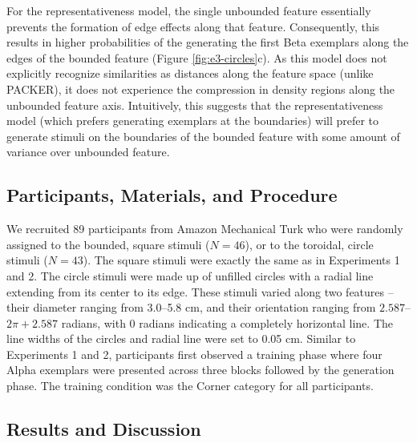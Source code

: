 \documentclass[12pt]{article}
\begin{document}
\begin{flushleft}
For the representativeness model, the single unbounded feature essentially
prevents the formation of edge effects along that feature. Consequently, this results in higher probabilities of the generating the first Beta exemplars along the edges of the bounded feature (Figure \ref{fig:e3-circles}c). As this
model does not explicitly recognize similarities as distances along the feature
space (unlike PACKER), it does not experience the compression in density regions
along the unbounded feature axis. Intuitively, this suggests that the
representativeness model (which prefers generating exemplars at the boundaries) will prefer to generate stimuli on the boundaries of the bounded feature with some amount of variance over unbounded feature.





\subsection{Participants, Materials, and Procedure}

We recruited 89 participants from Amazon Mechanical Turk who were randomly
assigned to the bounded, square stimuli ($N=46$), or to the toroidal, circle
stimuli ($N=43$). The square stimuli were exactly the same as in Experiments 1
and 2. The circle stimuli were made up of unfilled circles with a radial line
extending from its center to its edge. These stimuli varied along two features
-- their diameter ranging from 3.0--5.8 cm, and their orientation ranging from
$2.587$--$2\pi + 2.587$ radians, with $0$ radians indicating a completely
horizontal line. The line widths of the circles and radial line were set to 0.05
cm. Similar to Experiments 1 and 2, participants first observed a training phase
where four Alpha exemplars were presented across three blocks followed by the
generation phase. The training condition was the Corner category for all
participants.

\subsection{Results and Discussion}



\end{flushleft}
\end{document}

